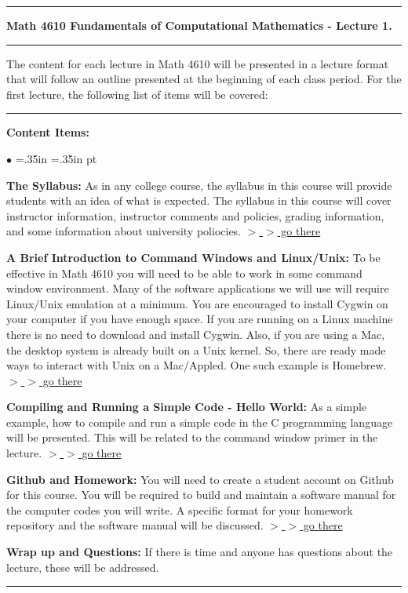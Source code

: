 \documentclass[10pt,fleqn]{article}
\begin{document}
\vskip0.1in\hrule\vskip0.1in
\noindent
{\bf Math 4610 Fundamentals of Computational Mathematics  - Lecture 1.} 
\vskip0.1in\hrule\vskip0.1in
\noindent
The content for each lecture in Math 4610 will be presented in a lecture format
that will follow an outline presented at the beginning of each class period.
For the first lecture, the following list of items will be covered:
\vskip0.1in\hrule\vskip0.1in
\noindent
{\bf Content Items:}
\begin{list}{$\bullet$}{ \parsep=0pt \listparindent=0pt
\topsep=0pt \rightmargin=.35in \leftmargin=.35in  pt
\itemsep=2pt}
  \item {\bf The Syllabus:} As in any college course, the syllabus in this
        course will provide students with an idea of what is expected. The
        syllabus in this course will cover instructor information, instructor
        comments and policies, grading information, and some information about
        university poliocies.
        \href{https://jvkoebbe.github.io/math4610/syllabus/md/syllabus}{$>$ $>$ go there}
  \item {\bf A Brief Introduction to Command Windows and Linux/Unix:} To be
        effective in Math 4610 you will need to be able to work in some command
        window environment. Many of the software applications we will use will
        require Linux/Unix emulation at a minimum. You are encouraged to install
        Cygwin on your computer if you have enough space. If you are running
        on a Linux machine there is no need to download and install Cygwin.
        Also, if you are using a Mac, the desktop system is already built on a
        Unix kernel. So, there are ready made ways to interact with Unix on a
        Mac/Appled. One such example is Homebrew.
        \href{https://jvkoebbe.github.io/math4610/lectures/lecture_01/pdf/cygwin_primer.pdf}{$>$ $>$ go there}
  \item {\bf Compiling and Running a Simple Code - Hello World:} As a simple
        example, how to compile and run a simple code in the C programming
        language will be presented. This will be related to the command window
        primer in the lecture.
        \href{https://jvkoebbe.github.io/math4610/lectures/lecture_01/pdf/coding_example.pdf}{$>$ $>$ go there}
  \item {\bf Github and Homework:} You will need to create a student account on
        Github for this course. You will be required to build and maintain a
        software manual for the computer codes you will write. A specific format
        for your homework repository and the software manual will be discussed.
        \href{https://jvkoebbe.github.io/math4610/lectures/lecture_01/pdf/github_primer.pdf}{$>$ $>$ go there}
  \item {\bf Wrap up and Questions:} If there is time and anyone has questions
        about the lecture, these will be addressed.
\end{list}
\vskip0.1in\hrule\vskip0.1in
\end{document}
